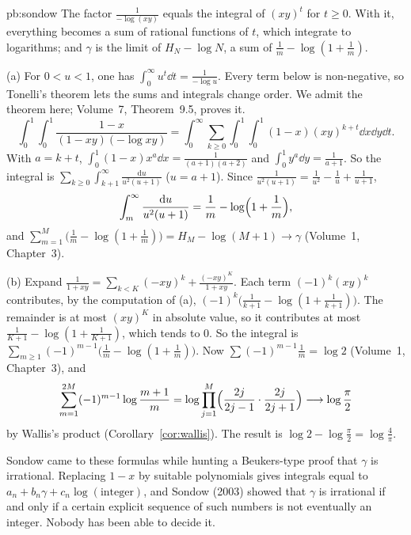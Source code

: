 \begin{solution}{pb:sondow}
\idea The factor $\frac1{-\log(xy)}$ equals the integral of $(xy)^t$ for $t\ge0$. With it, everything becomes a sum of rational
functions of $t$, which integrate to logarithms; and $\gamma$ is the limit of $H_N-\log N$, a sum of $\frac1m-\log(1+\frac1m)$.

\writeup (a) For $0<u<1$, one has $\int_0^\infty u^t\dd t=\frac1{-\log u}$. Every term below is non-negative, so Tonelli's theorem lets the sums and integrals change order. We admit the theorem here; Volume~7, Theorem~9.5, proves it.
\[
\int_0^1\!\!\int_0^1\frac{1-x}{(1-xy)(-\log xy)}=\int_0^\infty\sum_{k\ge0}\int_0^1\!\!\int_0^1(1-x)(xy)^{k+t}\dd x\dd y\dd t.
\]
With $a=k+t$, $\int_0^1(1-x)x^a\dd x=\frac1{(a+1)(a+2)}$ and $\int_0^1y^a\dd y=\frac1{a+1}$. So the integral is
$\sum_{k\ge0}\int_{k+1}^\infty\frac{\mathrm du}{u^2(u+1)}$ ($u=a+1$). Since $\frac1{u^2(u+1)}=\frac1{u^2}-\frac1u+\frac1{u+1}$,
\[
\int_m^\infty\frac{\mathrm du}{u^2(u+1)}=\frac1m-\log\Bigl(1+\frac1m\Bigr),
\]
and $\sum_{m=1}^M\bigl(\frac1m-\log(1+\frac1m)\bigr)=H_M-\log(M+1)\to\gamma$ (Volume~1, Chapter~3).

(b) Expand $\frac1{1+xy}=\sum_{k<K}(-xy)^k+\frac{(-xy)^K}{1+xy}$. Each term $(-1)^k(xy)^k$ contributes, by the computation of (a),
$(-1)^k\bigl(\frac1{k+1}-\log(1+\frac1{k+1})\bigr)$. The remainder is at most $(xy)^K$ in absolute value, so it contributes at most
$\frac1{K+1}-\log(1+\frac1{K+1})$, which tends to $0$. So the integral is $\sum_{m\ge1}(-1)^{m-1}\bigl(\frac1m-\log(1+\frac1m)\bigr)$.
Now $\sum(-1)^{m-1}\frac1m=\log2$ (Volume~1, Chapter~3), and
\[
\sum_{m=1}^{2M}(-1)^{m-1}\log\frac{m+1}m=\log\prod_{j=1}^M\Bigl(\frac{2j}{2j-1}\cdot\frac{2j}{2j+1}\Bigr)\longrightarrow\log\frac\pi2
\]
by Wallis's product (Corollary~\ref{cor:wallis}). The result is $\log2-\log\frac\pi2=\log\frac4\pi$.

\leads Sondow came to these formulas while hunting a Beukers-type proof that $\gamma$ is irrational. Replacing $1-x$ by suitable
polynomials gives integrals equal to $a_n+b_n\gamma+c_n\log(\text{integer})$, and Sondow (2003) showed that $\gamma$ is irrational if and
only if a certain explicit sequence of such numbers is not eventually an integer. Nobody has been able to decide it.
\end{solution}


